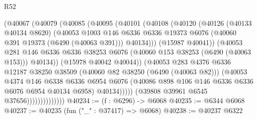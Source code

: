 \begin{lexlean}{R52}
\begin{coremodule}
                              (@40067
                                (@40079
                                  (@40085
                                    (@40095
                                      (@40101
                                        (@40108
                                          (@40120
                                            (@40126
                                              (@40133 @40134 @8620)
                                              (@40053
                                                @1003
                                                @146
                                                @6336
                                                @6336
                                                @19373
                                                @6076
                                                (@40060 @391 @19373 (@6490 (@40063 @391)))
                                                @40134)))
                                          (@15987 @40041))
                                        (@40053
                                          @281
                                          @146
                                          @6336
                                          @6336
                                          @38253
                                          @6076
                                          (@40060 @153 @38253 (@6490 (@40063 @153)))
                                          @40134))
                                      (@15978 @40042 @40044))
                                    (@40053
                                      @283
                                      @4376
                                      @6336
                                      @12187
                                      @38250
                                      @38509
                                      (@40060 @82 @38250 (@6490 (@40063 @82)))
                                      (@40053
                                        @4374
                                        @146
                                        @6338
                                        @6336
                                        @6954
                                        @6076
                                        (@40086 @898 @106 @146 @6336 @6336 @6076 @6954 @40134 @6958)
                                        @40134)))))
                              (@39808 @39961 @6545 @37656))))))))))))))
@40234 := (f : @6296) -> @6068
@40235 := @6344 @6068
@40237 := @40235 (fun ("_" : @37417) => @6068)
@40238 := @40237 @6322

\end{coremodule}
\end{lexlean}

